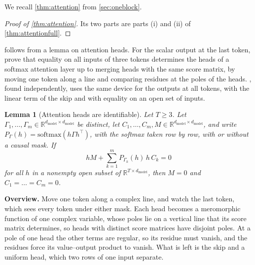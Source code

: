 \documentclass[10pt]{article}
\newtheorem{lemma}[theorem]{Lemma}
\theoremstyle{definition}
\theoremstyle{remark}
\newcommand{\R}{\mathbb{R}}
\newcommand{\dm}{d_{\mathrm{model}}}
\newcommand{\para}[1]{\smallskip\noindent\textbf{#1}\hspace{0.5em}}
\begin{document}
We recall \cref{thm:attention} from \cref{sec:oneblock}.
\thmAttention*

\begin{proof}[Proof of \cref{thm:attention}]
Its two parts are parts (i) and (ii) of \cref{thm:attentionfull}.
\end{proof}

 follows from a lemma on attention heads. For the scalar output at the last token, \citet[Proposition~3.1]{kim2026provably} prove that equality on all inputs of three tokens determines the heads of a softmax attention layer up to merging heads with the same score matrix, by moving one token along a line and comparing residues at the poles of the heads. , found independently, uses the same device for the outputs at all tokens, with the linear term of the skip and with equality on an open set of inputs.

\begin{lemma}[Attention heads are identifiable]\label{lem:heads}
Let $T \ge 3$. Let $\Gamma_1, \dots, \Gamma_m \in \R^{\dm\times\dm}$ be distinct, let $C_1, \dots, C_m, M \in \R^{\dm\times\dm}$, and write $P_\Gamma(h) = \mathrm{softmax}(h\Gamma h^\top)$, with the softmax taken row by row, with or without a causal mask. If
\[
hM + \sum_{k=1}^{m} P_{\Gamma_k}(h)\, h\, C_k = 0
\]
for all $h$ in a nonempty open subset of $\R^{T\times\dm}$, then $M = 0$ and $C_1 = \dots = C_m = 0$.
\end{lemma}

\para{Overview.} Move one token along a complex line, and watch the last token, which sees every token under either mask. Each head becomes a meromorphic function of one complex variable, whose poles lie on a vertical line that its score matrix determines, so heads with distinct score matrices have disjoint poles. At a pole of one head the other terms are regular, so its residue must vanish, and the residues force its value--output product to vanish. What is left is the skip and a uniform head, which two rows of one input separate.
\end{document}
